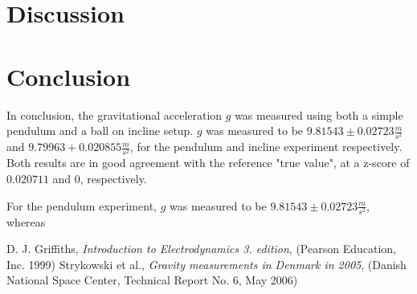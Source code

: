 \documentclass[a4paper,%
               aps,%
               prl,%
               amsfonts,%
               amssymb,%
               amsmath,%
               nobibnotes,%
               twocolumn, %
               twoside,%
               balancelastpage,%
               eqsecnum] %
               {revtex4-1}
\begin{document}
\section{Discussion}




\section{Conclusion}

In conclusion, the gravitational acceleration $g$ was measured using both a simple pendulum and a ball on incline setup. $g$ was measured to be $9.81543 \pm 0.02723 \frac{m}{s^2}$ and $9.79963+0.020855 \frac{m}{s^2}$, for the pendulum and incline experiment respectively. Both results are in good agreement with the reference "true value", at a z-score of $0.020711$ and $0$, respectively.

For the pendulum experiment, $g$ was measured to be $9.81543 \pm 0.02723 \frac{m}{s^2}$, whereas 


\begin{thebibliography}{99}  
 D. J. Griffiths, \emph{Introduction to Electrodynamics 3. edition}, (Pearson Education, Inc. 1999)        
 Strykowski et al., \emph{Gravity measurements in Denmark
in 2005}, (Danish National Space Center, Technical Report No. 6, May 2006)      
\end{thebibliography}
\end{document}
